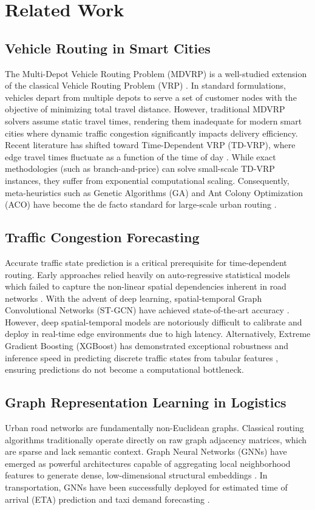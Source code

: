 \documentclass[conference]{IEEEtran}
\begin{document}
\section{Related Work}
\label{sec:related_work}

\subsection{Vehicle Routing in Smart Cities}
The Multi-Depot Vehicle Routing Problem (MDVRP) is a well-studied extension of the classical Vehicle Routing Problem (VRP) \cite{vrp_survey}. In standard formulations, vehicles depart from multiple depots to serve a set of customer nodes with the objective of minimizing total travel distance. However, traditional MDVRP solvers assume static travel times, rendering them inadequate for modern smart cities where dynamic traffic congestion significantly impacts delivery efficiency. Recent literature has shifted toward Time-Dependent VRP (TD-VRP), where edge travel times fluctuate as a function of the time of day \cite{tdvrp_ref}. While exact methodologies (such as branch-and-price) can solve small-scale TD-VRP instances, they suffer from exponential computational scaling. Consequently, meta-heuristics such as Genetic Algorithms (GA) and Ant Colony Optimization (ACO) have become the de facto standard for large-scale urban routing \cite{metaheuristic_survey}.

\subsection{Traffic Congestion Forecasting}
Accurate traffic state prediction is a critical prerequisite for time-dependent routing. Early approaches relied heavily on auto-regressive statistical models which failed to capture the non-linear spatial dependencies inherent in road networks \cite{arima_traffic}. With the advent of deep learning, spatial-temporal Graph Convolutional Networks (ST-GCN) have achieved state-of-the-art accuracy \cite{stgcn_traffic}. However, deep spatial-temporal models are notoriously difficult to calibrate and deploy in real-time edge environments due to high latency. Alternatively, Extreme Gradient Boosting (XGBoost) has demonstrated exceptional robustness and inference speed in predicting discrete traffic states from tabular features \cite{xgboost_traffic}, ensuring predictions do not become a computational bottleneck.

\subsection{Graph Representation Learning in Logistics}
Urban road networks are fundamentally non-Euclidean graphs. Classical routing algorithms traditionally operate directly on raw graph adjacency matrices, which are sparse and lack semantic context. Graph Neural Networks (GNNs) have emerged as powerful architectures capable of aggregating local neighborhood features to generate dense, low-dimensional structural embeddings \cite{gnn_survey}. In transportation, GNNs have been successfully deployed for estimated time of arrival (ETA) prediction and taxi demand forecasting \cite{gnn_eta}.
\end{document}
